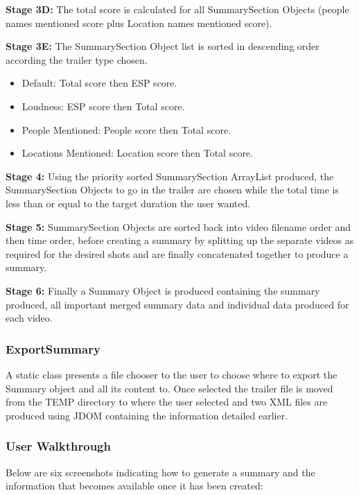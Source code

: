 \textbf{Stage 3D:} The total score is calculated for all SummarySection Objects (people names mentioned score plus Location names mentioned score).

\textbf{Stage 3E:} The SummarySection Object list is sorted in descending order according the trailer type chosen.
\begin{itemize}
	\item{Default: Total score then ESP score.}
	\item{Loudness: ESP score then Total score.}
	\item{People Mentioned: People score then Total score.}
	\item{Locations Mentioned: Location score then Total score.}
\end{itemize}

\textbf{Stage 4:} Using the priority sorted SummarySection ArrayList produced, the SummarySection Objects to go in the trailer are chosen while the total time is less than or equal to the target duration the user wanted.

\textbf{Stage 5:}  SummarySection Objects are sorted back into video filename order and then time order, before creating a summary by splitting up the separate videos as required for the desired shots and are finally concatenated together to produce a summary.

\textbf{Stage 6:} Finally a Summary Object is produced containing the summary produced, all important merged summary data and individual data produced for each video.

\subsubsection{ExportSummary}
A static class presents a file chooser to the user to choose where to export the Summary object and all its content to. Once selected the trailer file is moved from the TEMP directory to where the user selected and two XML files are produced using JDOM\cite{jdom} containing the information detailed earlier.

\newpage
\subsubsection{User Walkthrough}
Below are six screenshots indicating how to generate a summary and the information that becomes available once it has been created: 

